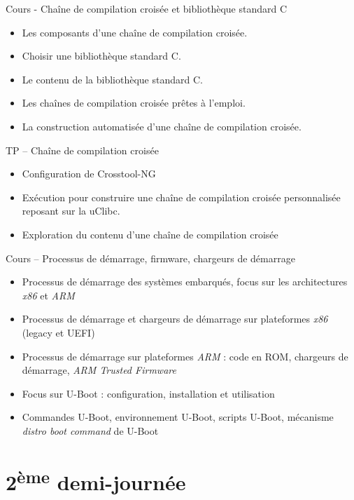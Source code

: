 \documentclass[a4paper,12pt,obeyspaces,spaces,hyphens]{article}
\begin{document}
\feagendatwocolumn
{Cours - Chaîne de compilation croisée et bibliothèque standard C}
{
  \begin{itemize}
  \item Les composants d'une chaîne de compilation croisée.
  \item Choisir une bibliothèque standard C.
  \item Le contenu de la bibliothèque standard C.
  \item Les chaînes de compilation croisée prêtes à l'emploi.
  \item La construction automatisée d'une chaîne de compilation croisée.
  \end{itemize}
}
{TP – Chaîne de compilation croisée}
{
  \begin{itemize}
  \item Configuration de Crosstool-NG
  \item Exécution pour construire une chaîne de compilation croisée
    personnalisée reposant sur la uClibc.
  \item Exploration du contenu d'une chaîne de compilation croisée
  \end{itemize}
}

\feagendaonecolumn
{Cours – Processus de démarrage, firmware, chargeurs de démarrage}
{
  \begin{itemize}
  \item Processus de démarrage des systèmes embarqués, focus sur les
    architectures {\em x86} et {\em ARM}
  \item Processus de démarrage et chargeurs de démarrage sur
    plateformes {\em x86} (legacy et UEFI)
  \item Processus de démarrage sur plateformes {\em ARM} : code en ROM,
    chargeurs de démarrage, {\em ARM Trusted Firmware}
  \item Focus sur U-Boot : configuration, installation et utilisation
  \item Commandes U-Boot, environnement U-Boot, scripts U-Boot,
    mécanisme {\em distro boot command} de U-Boot
  \end{itemize}
}

\section{2\textsuperscript{ème} demi-journée}
\end{document}
